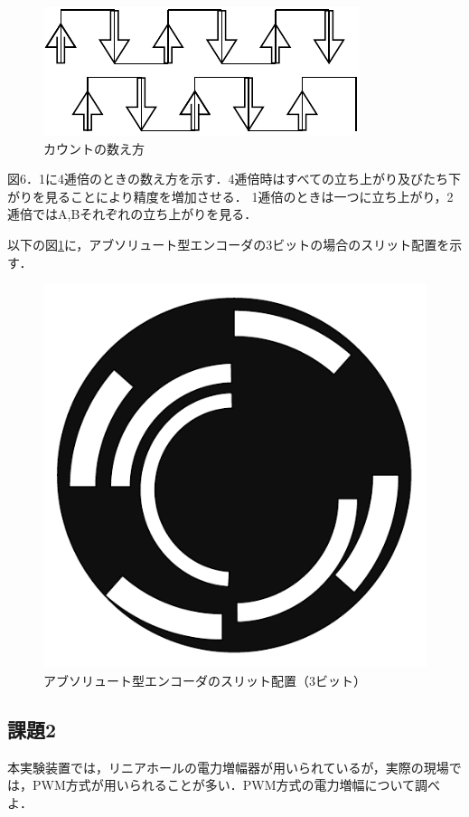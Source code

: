 \begin{figure}[h]
  \centering
  \includegraphics[scale=0.8]{sozai/11.pdf}
  \caption{カウントの数え方}
\end{figure}

図6．1に4逓倍のときの数え方を示す．4逓倍時はすべての立ち上がり及びたち下がりを見ることにより精度を増加させる．
1逓倍のときは一つに立ち上がり，2逓倍ではA,Bそれぞれの立ち上がりを見る．

以下の図\ref{fig:abs_encoder}に，アブソリュート型エンコーダの3ビットの場合のスリット配置を示す．
\begin{figure}[h]
  \centering
  \includegraphics[scale=0.5]{sozai/10.pdf}
  \caption{アブソリュート型エンコーダのスリット配置（3ビット）}
  \label{fig:abs_encoder}
\end{figure}



\subsection*{課題2}
本実験装置では，リニアホールの電力増幅器が用いられているが，実際の現場では，PWM方式が用いられることが多い．PWM方式の電力増幅について調べよ．


